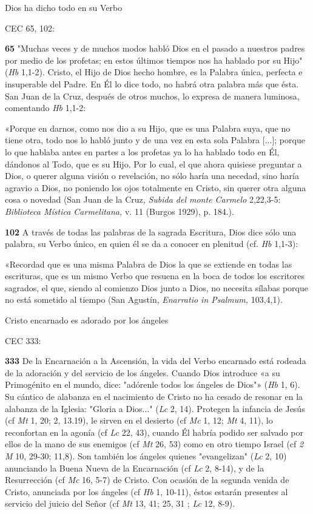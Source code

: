 \documentclass[]{article}
\begin{document}
Dios ha dicho todo en su Verbo

CEC 65, 102:  

\textbf{65} "Muchas veces y de muchos modos habló Dios en el pasado a
nuestros padres por medio de los profetas; en estos últimos tiempos nos
ha hablado por su Hijo" (\emph{Hb} 1,1-2). Cristo, el Hijo de Dios hecho
hombre, es la Palabra única, perfecta e insuperable del Padre. En Él lo
dice todo, no habrá otra palabra más que ésta. San Juan de la Cruz,
después de otros muchos, lo expresa de manera luminosa, comentando
\emph{Hb} 1,1-2:

«Porque en darnos, como nos dio a su Hijo, que es una Palabra suya, que
no tiene otra, todo nos lo habló junto y de una vez en esta sola Palabra
{[}...{]}; porque lo que hablaba antes en partes a los profetas ya lo ha
hablado todo en Él, dándonos al Todo, que es su Hijo. Por lo cual, el
que ahora quisiese preguntar a Dios, o querer alguna visión o
revelación, no sólo haría una necedad, sino haría agravio a Dios, no
poniendo los ojos totalmente en Cristo, sin querer otra alguna cosa o
novedad (San Juan de la Cruz, \emph{Subida del monte Carmelo} 2,22,3-5:
\emph{Biblioteca Mística Carmelitana,} v. 11 (Burgos 1929), p. 184.).

\textbf{102} A través de todas las palabras de la sagrada Escritura,
Dios dice sólo una palabra, su Verbo único, en quien él se da a conocer
en plenitud (cf. \emph{Hb} 1,1-3):

«Recordad que es una misma Palabra de Dios la que se extiende en todas
las escrituras, que es un mismo Verbo que resuena en la boca de todos
los escritores sagrados, el que, siendo al comienzo Dios junto a Dios,
no necesita sílabas porque no está sometido al tiempo (San Agustín,
\emph{Enarratio in Psalmum,} 103,4,1).

Cristo encarnado es adorado por los ángeles

CEC 333:  

\textbf{333} De la Encarnación a la Ascensión, la vida del Verbo
encarnado está rodeada de la adoración y del servicio de los ángeles.
Cuando Dios introduce «a su Primogénito en el mundo, dice: "adórenle
todos los ángeles de Dios"» (\emph{Hb} 1, 6). Su cántico de alabanza en
el nacimiento de Cristo no ha cesado de resonar en la alabanza de la
Iglesia: "Gloria a Dios..." (\emph{Lc} 2, 14). Protegen la infancia de
Jesús (cf \emph{Mt} 1, 20; 2, 13.19), le sirven en el desierto (cf
\emph{Mc} 1, 12; \emph{Mt} 4, 11), lo reconfortan en la agonía (cf
\emph{Lc} 22, 43), cuando Él habría podido ser salvado por ellos de la
mano de sus enemigos (cf \emph{Mt} 26, 53) como en otro tiempo Israel
(cf \emph{2 M} 10, 29-30; 11,8). Son también los ángeles quienes
"evangelizan" (\emph{Lc} 2, 10) anunciando la Buena Nueva de la
Encarnación (cf \emph{Lc} 2, 8-14), y de la Resurrección (cf \emph{Mc}
16, 5-7) de Cristo. Con ocasión de la segunda venida de Cristo,
anunciada por los ángeles (cf \emph{Hb} 1, 10-11), éstos estarán
presentes al servicio del juicio del Señor (cf \emph{Mt} 13, 41; 25, 31
; \emph{Lc} 12, 8-9).
\end{document}
